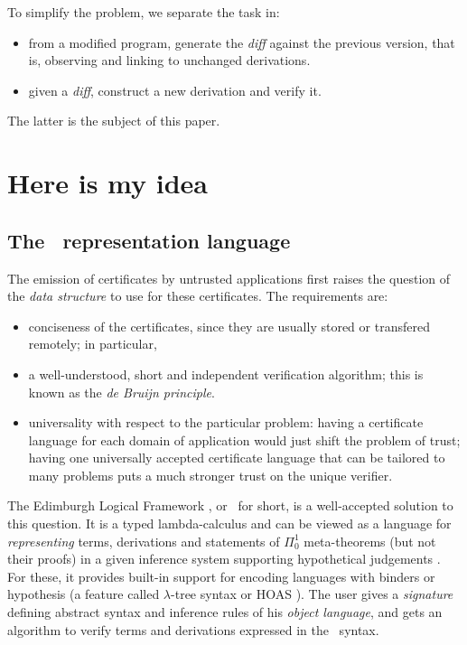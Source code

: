 \documentclass[9pt]{sigplanconf}
\begin{document}
To simplify the problem,
we separate the task in:
\begin{itemize}
\item from a modified program, generate the \emph{diff} against the
  previous version, that is, observing and linking to unchanged
  derivations.
\item given a \emph{diff}, construct a new derivation and verify it.
\end{itemize}
The latter is the subject of this paper.

\section{Here is my idea}


\subsection{The \LF\ representation language}

The emission of certificates by untrusted applications first raises
the question of the \emph{data structure} to use for these
certificates. The requirements are:
\begin{itemize}
\item conciseness of the certificates, since they are usually stored
  or transfered remotely; in particular,
\item a well-understood, short and independent verification algorithm;
  this is known as the \emph{de Bruijn principle}.
\item universality with respect to the particular problem: having a
  certificate language for each domain of application would just shift
  the problem of trust; having one universally accepted certificate
  language that can be tailored to many problems puts a much stronger
  trust on the unique verifier.
\end{itemize}

The Edimburgh Logical Framework \cite{harper1993framework}, or \LF\
for short, is a well-accepted solution to this question. It is a typed
lambda-calculus and can be viewed as a language for
\emph{representing} terms, derivations and statements of $\Pi_0^1$
meta-theorems (but not their proofs) in a given inference system
supporting hypothetical judgements \cite{pfenning2001logical}. For
these, it provides built-in support for encoding languages with
binders or hypothesis (a feature called $\lambda$-tree syntax or HOAS
\cite{pfenning1988higher}). The user gives a \emph{signature} defining
abstract syntax and inference rules of his \emph{object language}, and
gets an algorithm to verify terms and derivations expressed in the
\LF\ syntax.
\end{document}
